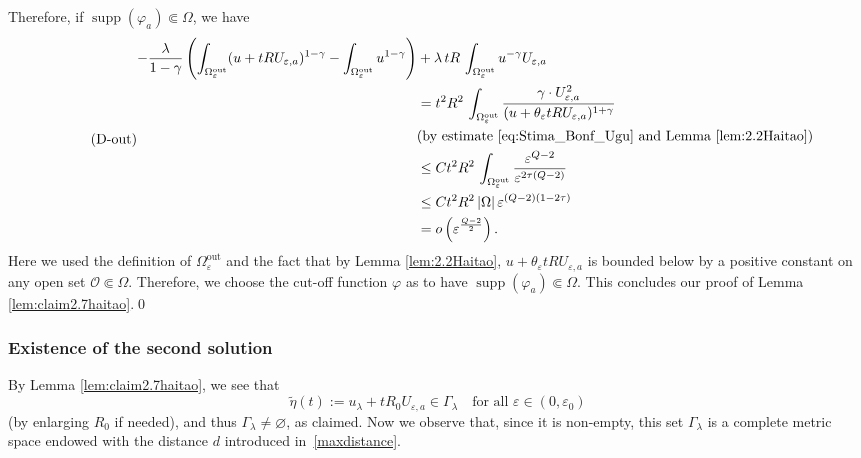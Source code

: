 \documentclass[11pt]{amsart}
\numberwithin{equation}{section} %
\theoremstyle{definition}
\newcommand{\m}{\mbox}
\newcommand{\fine}{\qed\newline}
\DeclareMathOperator{\supp}{supp}
\DeclareMathOperator{\Out}{out}
\def\dout{\Omega^{\Out}}
\begin{document}
Therefore, if $\supp(\varphi_a)\Subset\Omega$, we have
\begin{equation}\label{out}\tag{D-out}
\begin{aligned}
    -\frac{\lambda}{1-\gamma}\left(\int_{\dout_\varepsilon}(u+tRU_{\varepsilon,a})^{1-\gamma}-\int_{\dout_\varepsilon} u^{1-\gamma}\right)& +\lambda\, tR\, \int_{\dout_\varepsilon} u^{-\gamma}U_{\varepsilon,a}\\
    &=t^2R^2\, \int_{\dout_\varepsilon}\frac{\gamma\cdot U_{\varepsilon,a}^2}{(u+\theta_\varepsilon tRU_{\varepsilon,a})^{1+\gamma}}\\
    &(\m{by estimate \eqref{eq:Stima_Bonf_Ugu} and Lemma \ref{lem:2.2Haitao}})\\
    &\leq Ct^2R^2\, \int_{\dout_\varepsilon}\frac{\varepsilon^{Q-2}}{\varepsilon^{2\tau (Q-2)}}\\
    &\leq Ct^2R^2\, |\Omega|\, \varepsilon^{(Q-2)(1-2\tau)}\\
    &=o\left(\varepsilon^{\frac{Q-2}{2}}\right).
\end{aligned}
\end{equation}
Here we used the definition of $\dout_\varepsilon$
and the fact that by Lemma \ref{lem:2.2Haitao},
 $u+\theta_\varepsilon tRU_{\varepsilon,a}$ is bounded
 below by a positive constant on any  open set $\mathcal O\Subset\Omega$.
Therefore, we choose the cut-off function $\varphi$
as to have $\supp(\varphi_a)\Subset\Omega$.
This concludes our proof of Lemma \ref{lem:claim2.7haitao}.\fine

\subsubsection{Existence of the second solution}
By Lemma \ref{lem:claim2.7haitao}, we  see that
\begin{equation}\label{eq:eta}
	\widetilde \eta(t) := u_\lambda+tR_0U_{\varepsilon,a}\in \Gamma_\lambda\quad\text{for all $\varepsilon\in (0,\varepsilon_0)$}
\end{equation}
(by enlarging $R_0$ if needed),
and thus $\Gamma_\lambda\neq \varnothing$, as claimed.
Now we observe that, since it is non-empty,
this set $\Gamma_\lambda$ is a complete metric space endowed
with the distance $d$ introduced in~\eqref{maxdistance}.
\end{document}
